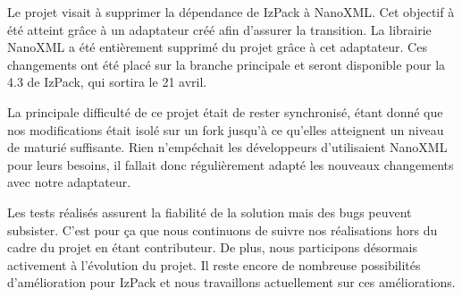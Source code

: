 Le projet visait à supprimer la dépendance de IzPack à NanoXML.
Cet objectif à été atteint grâce à un adaptateur créé afin d'assurer la transition.
La librairie NanoXML a été entièrement supprimé du projet grâce à cet adaptateur.
Ces changements ont été placé sur la branche principale et seront disponible pour la 4.3 de IzPack, qui sortira le 21 avril.

La principale difficulté de ce projet était de rester synchronisé, étant donné que nos modifications était isolé sur un fork jusqu'à ce qu'elles atteignent un niveau de maturié suffisante.
Rien n'empéchait les développeurs d'utilisaient NanoXML pour leurs besoins, il fallait donc régulièrement adapté les nouveaux changements avec notre adaptateur.

Les tests réalisés assurent la fiabilité de la solution mais des bugs peuvent subsister.
C'est pour ça que nous continuons de suivre nos réalisations hors du cadre du projet en étant contributeur.
De plus, nous participons désormais activement à l'évolution du projet.
Il reste encore de nombreuse possibilités d'amélioration pour IzPack et nous travaillons actuellement sur ces améliorations.
